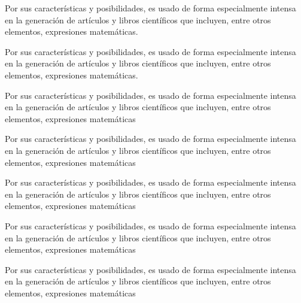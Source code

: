 \documentclass{book}
\begin{document}
\begin{multicols}{2}
  Por sus características y posibilidades, es usado de forma especialmente intensa en la generación de artículos y libros científicos que incluyen, entre otros elementos, expresiones matemáticas.
\end{multicols}

\begin{multicols}{3}
  Por sus características y posibilidades, es usado de forma especialmente intensa en la generación de artículos y libros científicos que incluyen, entre otros elementos, expresiones matemáticas.
\end{multicols}

\begin{minipage}[b]{4cm}
  Por sus características y posibilidades, es usado de forma especialmente intensa en la generación de artículos y libros científicos que incluyen, entre otros elementos, expresiones matemáticas
\end{minipage}


\vspace{2cm}

\begin{minipage}[b]{0.45\textwidth}
  Por sus características y posibilidades, es usado de forma especialmente intensa en la generación de artículos y libros científicos que incluyen, entre otros elementos, expresiones matemáticas
\end{minipage}\hfill
\begin{minipage}[b]{0.45\textwidth}
  Por sus características y posibilidades, es usado de forma especialmente intensa en la generación de artículos y libros científicos que incluyen, entre otros elementos, expresiones matemáticas
\end{minipage}

\vspace{2cm}

\parbox{0.45\textwidth}{%
  Por sus características y posibilidades, es usado de forma especialmente intensa en la generación de artículos y libros científicos que incluyen, entre otros elementos, expresiones matemáticas
}
\parbox{0.45\textwidth}{%
  Por sus características y posibilidades, es usado de forma especialmente intensa en la generación de artículos y libros científicos que incluyen, entre otros elementos, expresiones matemáticas
}
\end{document}
